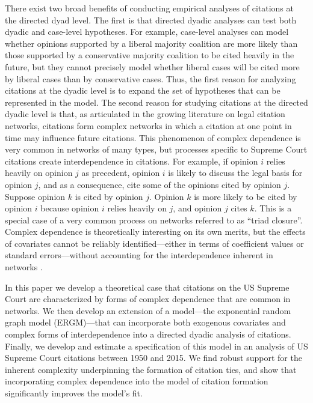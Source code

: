 \documentclass[headsepline=true, abstracton]{scrartcl}
\begin{document}
There exist two broad benefits of conducting empirical analyses of citations at the directed dyad level. The first is that directed dyadic analyses can test both dyadic and case-level hypotheses. For example, case-level analyses can model whether opinions supported by a liberal majority coalition are more likely than those supported by a conservative majority coalition to be cited heavily in the future, but they cannot precisely model whether liberal cases will be cited more by liberal cases than by conservative cases. Thus, the first reason for analyzing citations at the dyadic level is to expand the set of hypotheses that can be represented in the model. The second reason for studying citations at the directed dyadic level is that, as articulated in the growing literature on legal citation networks, citations form complex networks in which a citation at one point in time may influence future citations. This phenomenon of complex dependence is very common in networks of many types, but processes specific to Supreme Court citations create interdependence in citations. For example, if opinion $i$ relies heavily on opinion $j$ as precedent, opinion $i$ is likely to discuss the legal basis for opinion $j$, and as a consequence, cite some of the opinions cited by opinion $j$. Suppose opinion $k$ is cited by opinion $j$. Opinion $k$ is more likely to be cited by opinion $i$ because opinion $i$ relies heavily on $j$, and opinion $j$ cites $k$.  This is a special case of a very common process on networks referred to as ``triad closure''. Complex dependence is theoretically interesting on its own merits, but the effects of covariates cannot be reliably identified---either in terms of coefficient values or standard errors---without accounting for the interdependence inherent in networks \citep{desmaraisstatistical}. 

In this paper we develop a theoretical case that citations on the US Supreme Court are characterized by forms of complex dependence that are common in networks. We then develop an extension of a model---the exponential random graph model (ERGM)---that can incorporate both exogenous covariates and complex forms of interdependence into a directed dyadic analysis of citations. Finally, we develop and estimate a specification of this model in an analysis of US Supreme Court citations between 1950 and 2015. We find robust support for the inherent complexity underpinning the formation of citation ties, and show that incorporating complex dependence into the model of citation formation significantly improves the model's fit.
\end{document}
